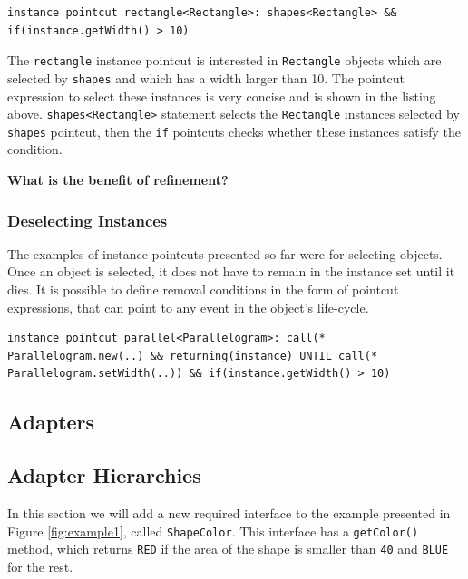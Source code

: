 \documentclass{llncs}
\begin{document}
\begin{lstlisting}[float=h!]
instance pointcut rectangle<Rectangle>: shapes<Rectangle> &&  if(instance.getWidth() > 10)
\end{lstlisting}

The \texttt{rectangle} instance pointcut is interested in \texttt{Rectangle} objects which are selected by \texttt{shapes} and which has a width larger than 10. The pointcut expression to select these instances is very concise and is shown in the listing above. \texttt{shapes<Rectangle>} statement selects the \texttt{Rectangle} instances selected by \texttt{shapes} pointcut, then the \texttt{if} pointcuts checks whether these instances satisfy the condition. 

\textbf{\textcolor[rgb]{1,0.41,0.13}{What is the benefit of refinement?}}

\subsubsection{Deselecting Instances}
The examples of instance pointcuts presented so far were for selecting objects. Once an object is selected, it does not have to remain in the instance set until it dies. It is possible to define removal conditions in the form of pointcut expressions, that can point to any event in the object's life-cycle.

\begin{lstlisting}[float=h!]
instance pointcut parallel<Parallelogram>: call(* Parallelogram.new(..) && returning(instance) UNTIL call(* Parallelogram.setWidth(..)) && if(instance.getWidth() > 10)
\end{lstlisting}


\subsection{Adapters}

\subsection{Adapter Hierarchies}
In this section we will add a new required interface to the example presented in Figure \ref{fig:example1}, called \texttt{ShapeColor}. This interface has a \texttt{getColor()} method, which returns \texttt{RED} if the area of the shape is smaller than \texttt{40} and \texttt{BLUE} for the rest. 
\end{document}

